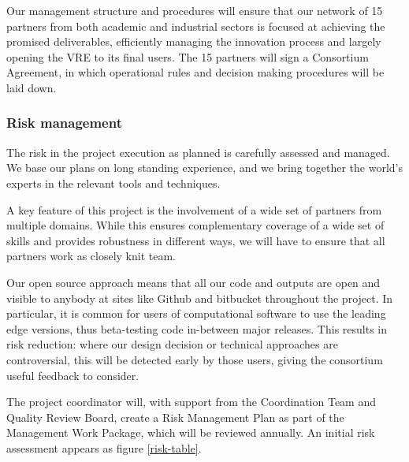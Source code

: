 Our management structure and procedures will ensure that our network
of 15 partners from both academic and industrial sectors is focused at
achieving the promised deliverables, efficiently managing the
innovation process and largely opening the VRE to its final users. The
15 partners will sign a Consortium Agreement, in which operational
rules and decision making procedures will be laid down.

\subsubsection{Risk management}\label{sec:risks}

The risk in the project execution as planned is carefully assessed and
managed. We base our plans on long standing experience, and we bring
together the world's experts in the relevant tools and techniques.

A key feature of this project is the involvement of a wide set of
partners from multiple domains. While this ensures complementary
coverage of a wide set of skills and provides robustness in different
ways, we will have to ensure that all partners work as closely knit
team. 

Our open source approach means that all our code and outputs
are open and visible to anybody at sites like Github and bitbucket
throughout the project. In particular, it is common for users of
computational software to use the leading edge versions, thus
beta-testing code in-between major releases. This results in risk
reduction: where our design decision or technical approaches are
controversial, this will be detected early by those users, giving the
consortium useful feedback to consider.

The project coordinator will, with support from the Coordination Team
and Quality Review Board, create a Risk Management Plan
 as part of the Management Work Package,
which will be reviewed annually. An initial risk assessment appears
as figure \ref{risk-table}.

